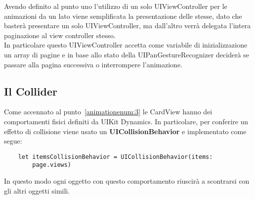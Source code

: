 Avendo definito al punto uno l'utilizzo di un solo UIViewController per le animazioni da un lato viene semplificata
la presentazione delle stesse, dato che basterà presentare un solo UIViewController, ma dall'altro verrà delegata
l'intera paginazione al view controller stesso. \\

In particolare questo UIViewController accetta come variabile di inizializzazione
un array di pagine e in base allo stato della UIPanGestureRecognizer deciderà se passare alla pagina successiva
o interrompere l'animazione.

\subsection{Il Collider}

Come accennato al punto~\ref{animationenum:3} le CardView hanno dei comportamenti fisici definiti
da UIKit Dynamics. In particolare, per conferire un effetto di collisione viene usato un \textbf{UICollisionBehavior} e implementato come segue:

\begin{verbatim}
    let itemsCollisionBehavior = UICollisionBehavior(items:
        page.views)
\end{verbatim}

In questo modo ogni oggetto con questo
comportamento riuscirà a scontrarsi con gli altri oggetti simili.
